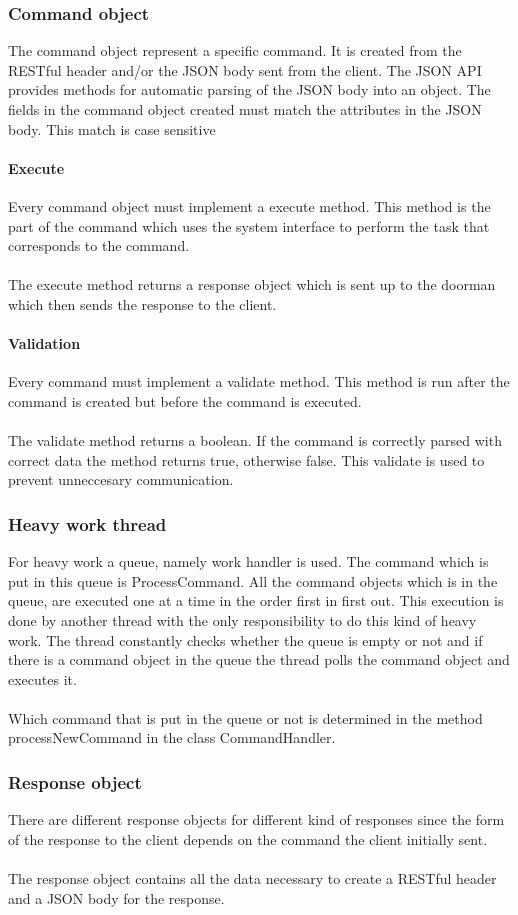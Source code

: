 \subsubsection{Command object}
The command object represent a specific command. It is created from the RESTful header and/or the JSON body sent from the client. The JSON API provides methods for automatic parsing of the JSON body into an object. The fields in the command object created must match the attributes in the JSON body. This match is case sensitive
\paragraph{Execute}
Every command object must implement a execute method. This method is the part of the command which uses the system interface to perform the task that corresponds to the command.\\
\\
The execute method returns a response object which is sent up to the doorman which then sends the response to the client. 
\paragraph{Validation}
Every command must implement a validate method. This method is run after the command is created but before the command is executed.\\
\\
The validate method returns a boolean. If the command is correctly parsed with correct data the method returns true, otherwise false. This validate is used to prevent unneccesary communication.
\subsubsection{Heavy work thread}
For heavy work a queue, namely work handler is used. The command which is put in this queue is ProcessCommand. All the command objects which is in the queue, are executed one at a time  in the order first in first out. This execution is done by another thread with the only responsibility to do this kind of heavy work. The thread constantly checks whether the queue is empty or not and if there is a command object in the queue the thread polls the command object and executes it.\\
\\
Which command that is put in the queue or not is determined in the method processNewCommand  in the class CommandHandler. 
\subsubsection{Response object}
There are different response objects for different kind of responses since the form of the response to the client depends on the command the client initially sent.\\
\\
The response object contains all the data necessary to create a RESTful header and a JSON body for the response.

